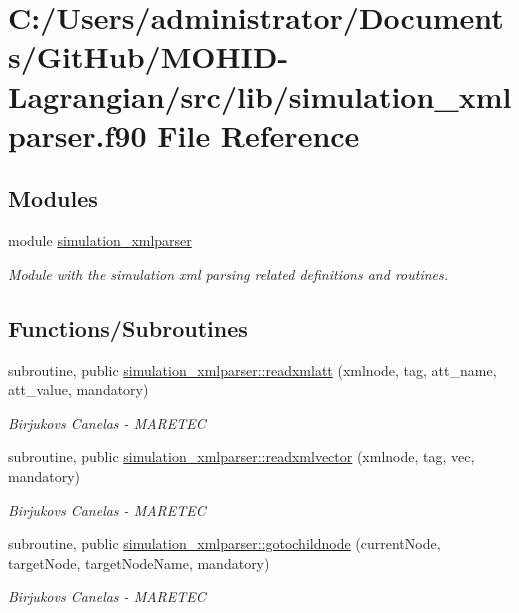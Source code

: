 \hypertarget{simulation__xmlparser_8f90}{}\section{C\+:/\+Users/administrator/\+Documents/\+Git\+Hub/\+M\+O\+H\+I\+D-\/\+Lagrangian/src/lib/simulation\+\_\+xmlparser.f90 File Reference}
\label{simulation__xmlparser_8f90}
\subsection*{Modules}
\begin{DoxyCompactItemize}
\item 
module \mbox{\hyperlink{namespacesimulation__xmlparser}{simulation\+\_\+xmlparser}}
\begin{DoxyCompactList}\small\item\em Module with the simulation xml parsing related definitions and routines. \end{DoxyCompactList}\end{DoxyCompactItemize}
\subsection*{Functions/\+Subroutines}
\begin{DoxyCompactItemize}
\item 
subroutine, public \mbox{\hyperlink{namespacesimulation__xmlparser_ae5a51c63402f76781f333aead6d1084d}{simulation\+\_\+xmlparser\+::readxmlatt}} (xmlnode, tag, att\+\_\+name, att\+\_\+value, mandatory)
\begin{DoxyCompactList}\small\item\em Birjukovs Canelas -\/ M\+A\+R\+E\+T\+EC \end{DoxyCompactList}\item 
subroutine, public \mbox{\hyperlink{namespacesimulation__xmlparser_aa20b02586a497ea7ef90cb5b05cb2af7}{simulation\+\_\+xmlparser\+::readxmlvector}} (xmlnode, tag, vec, mandatory)
\begin{DoxyCompactList}\small\item\em Birjukovs Canelas -\/ M\+A\+R\+E\+T\+EC \end{DoxyCompactList}\item 
subroutine, public \mbox{\hyperlink{namespacesimulation__xmlparser_a9a66c3a491ca567688fef7148e2d12d8}{simulation\+\_\+xmlparser\+::gotochildnode}} (current\+Node, target\+Node, target\+Node\+Name, mandatory)
\begin{DoxyCompactList}\small\item\em Birjukovs Canelas -\/ M\+A\+R\+E\+T\+EC \end{DoxyCompactList}\end{DoxyCompactItemize}
